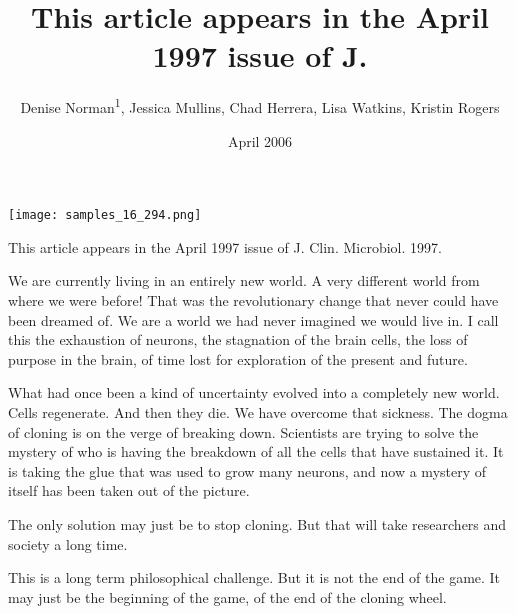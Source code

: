 \documentclass{article}
\title{This article appears in the April 1997 issue of J.}
\author{Denise Norman\textsuperscript{1},  Jessica Mullins,  Chad Herrera,  Lisa Watkins,  Kristin Rogers}
\affil{\textsuperscript{1}SUNY Upstate Medical University}
\date{April 2006}
\begin{document}
\maketitle

\begin{center}
\begin{minipage}{0.75\linewidth}
\texttt{[image: samples\_16\_294.png]}
\end{minipage}
\end{center}

This article appears in the April 1997 issue of J. Clin. Microbiol. 1997.

We are currently living in an entirely new world. A very different world from where we were before! That was the revolutionary change that never could have been dreamed of. We are a world we had never imagined we would live in. I call this the exhaustion of neurons, the stagnation of the brain cells, the loss of purpose in the brain, of time lost for exploration of the present and future.

What had once been a kind of uncertainty evolved into a completely new world. Cells regenerate. And then they die. We have overcome that sickness. The dogma of cloning is on the verge of breaking down. Scientists are trying to solve the mystery of who is having the breakdown of all the cells that have sustained it. It is taking the glue that was used to grow many neurons, and now a mystery of itself has been taken out of the picture.

The only solution may just be to stop cloning. But that will take researchers and society a long time.

This is a long term philosophical challenge. But it is not the end of the game. It may just be the beginning of the game, of the end of the cloning wheel.
\end{document}
